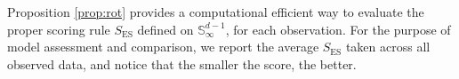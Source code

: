 Proposition \ref{prop:rot} provides a computational efficient way to evaluate the proper
    scoring rule $S_{\text{ES}}$ defined on ${\mathbb S}_\infty^{d-1}$, for each 
    observation. For the purpose of model assessment and comparison, we report the 
    average $S_{\text{ES}}$ taken across all observed data, and notice that the smaller 
    the score, the better.
    
